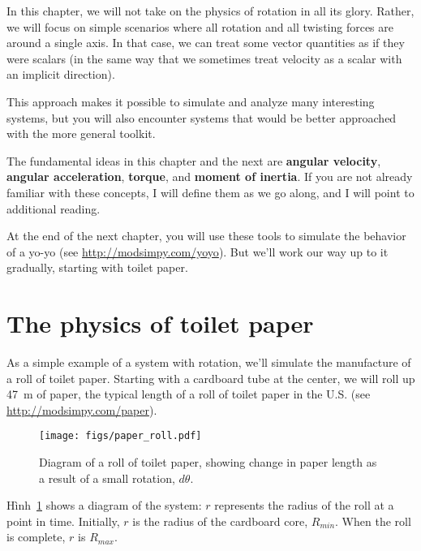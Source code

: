 \documentclass[12pt]{book}
\theoremstyle{exercise}
\begin{document}

In this chapter, we will not take on the physics of rotation in all its glory.  Rather, we will focus on simple scenarios where all rotation and all twisting forces are around a single axis.  In that case, we can treat some vector quantities as if they were scalars (in the same way that we sometimes treat velocity as a scalar with an implicit direction).


This approach makes it possible to simulate and analyze many interesting systems, but you will also encounter systems that would be better approached with the more general toolkit.

The fundamental ideas in this chapter and the next are {\bf angular velocity}, {\bf angular acceleration}, {\bf torque}, and {\bf moment of inertia}.  If you are not already familiar with these concepts, I will define them as we go along, and I will point to additional reading.

At the end of the next chapter, you will use these tools to simulate the behavior of a yo-yo (see \url{http://modsimpy.com/yoyo}).  But we'll work our way up to it gradually, starting with toilet paper.



\section{The physics of toilet paper}
\label{paper}

As a simple example of a system with rotation, we'll simulate the manufacture of a roll of toilet paper.  Starting with a cardboard tube at the center, we will roll up \SI{47}{\meter} of paper, the typical length of a roll of toilet paper in the U.S. (see \url{http://modsimpy.com/paper}).


\begin{figure}
\centerline{\texttt{[image: figs/paper\_roll.pdf]}}
\caption{Diagram of a roll of toilet paper, showing change in paper length as a result of a small rotation, $d\theta$.}
\label{paper_roll}
\end{figure}

Hình~\ref{paper_roll} shows a diagram of the system: $r$ represents the radius of the roll at a point in time.  Initially, $r$ is the radius of the cardboard core, $R_{min}$.  When the roll is complete, $r$ is $R_{max}$.
\end{document}
